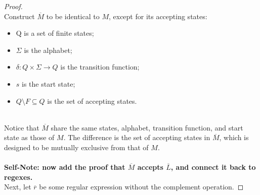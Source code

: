 \documentclass[12pt]{article}
\begin{document}
\begin{proof}
    \\
    Construct $\overline{M}$ to be identical to $M$, except for its accepting states:
    \begin{itemize}
        \item Q is a set of finite states;
        \item $\Sigma$ is the alphabet;
        \item $\delta : Q \times \Sigma \to Q$ is the transition function;
        \item $s$ is the start state;
        \item $Q \setminus F \subseteq Q$ is the set of accepting states.
    \end{itemize}
    \leavevmode\\
    Notice that $\overline{M}$ share the same states, alphabet, transition function, and start state as those of $M$. The difference is the set of accepting states in $\overline{M}$, which is designed to be mutually exclusive from that of $M$. \\
    \\
    \textbf{Self-Note: now add the proof that $\overline{M}$ accepts $\overline{L}$, and connect it back to regexes.}
    \\
    Next, let $\overline{r}$ be some regular expression without the complement operation.

\end{proof}
\pagebreak
\end{document}
